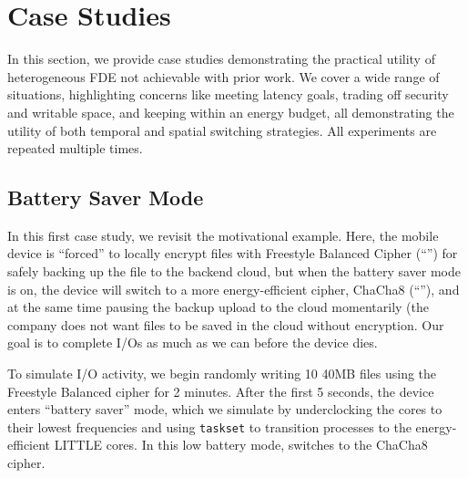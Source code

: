 \section{Case Studies}\label{sec:usecases}

In this section, we provide \numCases case studies demonstrating the practical
utility of heterogeneous FDE not achievable with prior work. We cover a wide
range of situations, highlighting concerns like meeting latency goals, trading
off security and writable space, and keeping within an energy budget, all
demonstrating the utility of both temporal and spatial switching strategies. All
experiments are repeated multiple times.


\subsection{Battery Saver Mode}\label{subsec:usecase-battery}

In this first case study, we revisit the motivational example. Here, the mobile
device is ``forced'' to locally encrypt files with Freestyle Balanced Cipher
(``\cone'') for safely backing up the file to the backend cloud, but when the
battery saver mode is on, the device will switch to a more energy-efficient
cipher, ChaCha8 (``\ctwo''), and at the same time pausing the backup upload to
the cloud momentarily (\eg the company does not want files to be saved in the
cloud without \cone encryption. Our goal is to complete I/Os as much as we can
before the device dies.

To simulate I/O activity, we begin randomly writing 10 40MB files using the
Freestyle Balanced cipher for 2 minutes. After the first 5 seconds, the device
enters ``battery saver'' mode, which we simulate by underclocking the cores to
their lowest frequencies and using \texttt{taskset} to transition \sys processes
to the energy-efficient LITTLE cores. In this low battery mode, \sys switches to
the ChaCha8 cipher.



